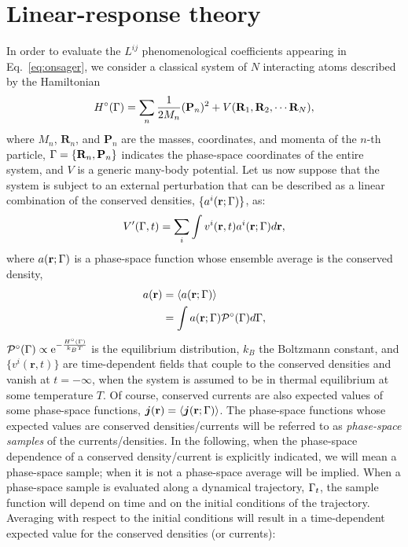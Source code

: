 \section{Linear-response theory}  \label{sec:linear-response}
In order to evaluate the $L^{ij}$ phenomenological coefficients appearing in Eq.~\eqref{eq:onsager}, we consider a classical system of $N$ interacting atoms described by the Hamiltonian
\begin{equation}
  H^\circ(\rGamma) = \sum_n\frac{1}{2M_n}(\mathbf{P}_n)^2 + V(\mathbf{R}_1,\mathbf{R}_2,\cdots \mathbf{R}_N), \label{eq:unperturbed_H}
\end{equation}
where $M_n$, $\mathbf{R}_n$, and $\mathbf{P}_n$ are the masses, coordinates, and momenta of the $n$-th particle, ${\mathrm\Gamma}=\{\mathbf{R}_n,\mathbf{P}_n\}$ indicates the phase-space coordinates of the entire system, and $V$ is a generic many-body potential. Let us now suppose that the system is subject to an external perturbation that can be described as a linear combination of the conserved densities, $\{a^i(\mathbf{r};{\mathrm\Gamma})\}$, as:
\begin{equation}
   V'(\rGamma,t) = \sum_i \int  v^i(\mathbf{r},t) a^i(\mathbf{r};\rGamma) d\mathbf{r}, \label{eq:perturbation}
\end{equation}
where $a(\mathbf{r};{\mathrm\Gamma})$ is a phase-space function whose ensemble average is the conserved density,
\begin{equation}
    \begin{aligned}
      a(\mathbf{r}) &= \langle a(\mathbf{r};{\mathrm\Gamma}) \rangle \\
      & = \int a(\mathbf{r};{\mathrm\Gamma}) \mathcal{P}^\circ({\mathrm\Gamma})d{\mathrm\Gamma},
    \end{aligned}
\end{equation}
$\mathcal{P}^\circ({\mathrm\Gamma}) \propto \mathrm{e}^{-\frac{H^\circ({\mathrm\Gamma})}{k_BT}}$ is the equilibrium distribution, $k_B$ the Boltzmann constant, and $\{v^i(\mathbf{r},t)\}$ are time-dependent fields that couple to the conserved densities and vanish at $t=-\infty$, when the system is assumed to be in thermal equilibrium at some temperature $T$. Of course, conserved currents are also expected values of some phase-space functions, $\bm{j}(\mathbf{r})=\langle \bm{j}(\mathbf{r};{\mathrm\Gamma})\rangle$. The phase-space functions whose expected values are conserved densities/currents will be referred to as \emph{phase-space samples} of the currents/densities. In the following, when the phase-space dependence of a conserved density/current is explicitly indicated, we will mean a phase-space sample; when it is not a phase-space average will be implied. When a phase-space sample is evaluated along a dynamical trajectory, ${\mathrm\Gamma}_t$, the sample function will depend on time and on the initial conditions of the trajectory. Averaging with respect to the initial conditions will result in a time-dependent expected value for the conserved densities (or currents):
